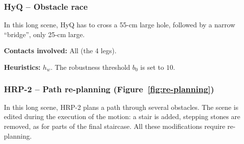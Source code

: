 \documentclass[journal]{IEEEtran}
\newcommand{\gls}[1]{\textit{#1}}
\begin{document}
\subsubsection{HyQ -- Obstacle race }
In this long scene, HyQ has to cross a 55-cm large hole, followed by a narrow ``bridge'', only 25-cm large.





\noindent\textbf{Contacts involved:} All (the 4 legs).

\noindent\textbf{Heuristics:} $h_w$. The robustness threshold $b_0$ is set to $10$.


\subsubsection{HRP-2 -- Path re-planning (Figure~\ref{fig:re-planning})}
In this long scene, HRP-2 plans a path through several obstacles. The scene is edited during the execution of the motion: a stair is added,
stepping stones are removed, as for parts of the final staircase. All these modifications require re-planning.
\end{document}
